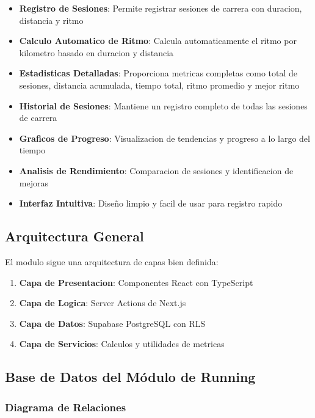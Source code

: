 \documentclass[12pt,a4paper]{article}
\begin{document}
\begin{itemize}
    \item \textbf{Registro de Sesiones}: Permite registrar sesiones de carrera con duracion, distancia y ritmo
    \item \textbf{Calculo Automatico de Ritmo}: Calcula automaticamente el ritmo por kilometro basado en duracion y distancia
    \item \textbf{Estadisticas Detalladas}: Proporciona metricas completas como total de sesiones, distancia acumulada, tiempo total, ritmo promedio y mejor ritmo
    \item \textbf{Historial de Sesiones}: Mantiene un registro completo de todas las sesiones de carrera
    \item \textbf{Graficos de Progreso}: Visualizacion de tendencias y progreso a lo largo del tiempo
    \item \textbf{Analisis de Rendimiento}: Comparacion de sesiones y identificacion de mejoras
    \item \textbf{Interfaz Intuitiva}: Diseño limpio y facil de usar para registro rapido
\end{itemize}

\subsection{Arquitectura General}

El modulo sigue una arquitectura de capas bien definida:

\begin{enumerate}
    \item \textbf{Capa de Presentacion}: Componentes React con TypeScript
    \item \textbf{Capa de Logica}: Server Actions de Next.js
    \item \textbf{Capa de Datos}: Supabase PostgreSQL con RLS
    \item \textbf{Capa de Servicios}: Calculos y utilidades de metricas
\end{enumerate}

\subsection{Base de Datos del Módulo de Running}

\subsubsection{Diagrama de Relaciones}
\end{document}
